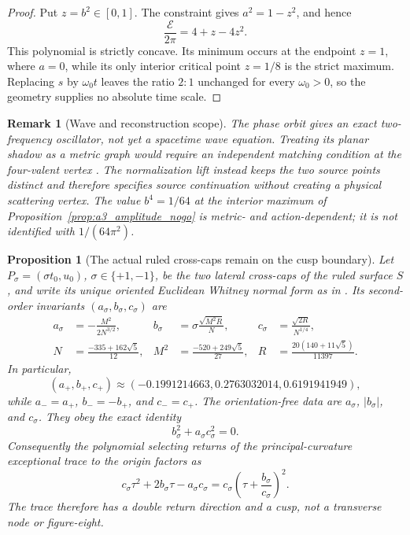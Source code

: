 \documentclass[11pt]{article}
\newtheorem{proposition}[theorem]{Proposition}
\newtheorem{remark}[theorem]{Remark}
\begin{document}
\begin{proof}
Put $z=b^2\in[0,1]$.  The constraint gives $a^2=1-z^2$, and hence
\[
 \frac{\mathcal E}{2\pi}=4+z-4z^2.
\]
This polynomial is strictly concave.  Its minimum occurs at the endpoint
$z=1$, where $a=0$, while its only interior critical point $z=1/8$ is the
strict maximum.  Replacing $s$ by $\omega_0t$ leaves the ratio $2:1$ unchanged
for every $\omega_0>0$, so the geometry supplies no absolute time scale.
\end{proof}

\begin{remark}[Wave and reconstruction scope]
The phase orbit gives an exact two-frequency oscillator, not yet a spacetime
wave equation.  Treating its planar shadow as a metric graph would require an
independent matching condition at the four-valent vertex
\cite{EngelKramar2019}.  The normalization lift instead keeps the two source
points distinct and therefore specifies source continuation without creating
a physical scattering vertex.  The value $b^4=1/64$ at the interior maximum
of Proposition~\ref{prop:a3_amplitude_nogo} is metric- and action-dependent;
it is not identified with $1/(64\pi^2)$.
\end{remark}

\begin{proposition}[The actual ruled cross-caps remain on the cusp boundary]
\label{prop:actual_principal_cusp}
Let $P_\sigma=(\sigma t_0,u_0)$, $\sigma\in\{+1,-1\}$, be the two lateral
cross-caps of the ruled surface $S$, and write its unique oriented Euclidean
Whitney normal form as in \cite[Proposition~2.1]{MartinsEtAl2026}.  Its
second-order invariants $(a_\sigma,b_\sigma,c_\sigma)$ are
\begin{align*}
 a_\sigma&=-\frac{M^2}{2N^{3/2}},
 &b_\sigma&=\sigma\frac{\sqrt{M^2R}}{N},
 &c_\sigma&=\frac{\sqrt{2R}}{N^{1/4}},\\
 N&=\frac{-335+162\sqrt5}{12},
 &M^2&=\frac{-520+249\sqrt5}{27},
 &R&=\frac{20(140+11\sqrt5)}{11397}.
\end{align*}
In particular,
\[
 (a_+,b_+,c_+)\approx(-0.1991214663,0.2763032014,0.6191941949),
\]
while $a_-=a_+$, $b_-=-b_+$, and $c_-=c_+$.  The orientation-free data are
$a_\sigma$, $|b_\sigma|$, and $c_\sigma$.  They obey the exact identity
\begin{equation}
 b_\sigma^2+a_\sigma c_\sigma^2=0.
 \label{eq:actual_principal_cusp_identity}
\end{equation}
Consequently the polynomial selecting returns of the principal-curvature
exceptional trace to the origin factors as
\[
 c_\sigma\tau^2+2b_\sigma\tau-a_\sigma c_\sigma
 =c_\sigma\left(\tau+\frac{b_\sigma}{c_\sigma}\right)^2.
\]
The trace therefore has a double return direction and a cusp, not a
transverse node or figure-eight.
\end{proposition}
\end{document}
